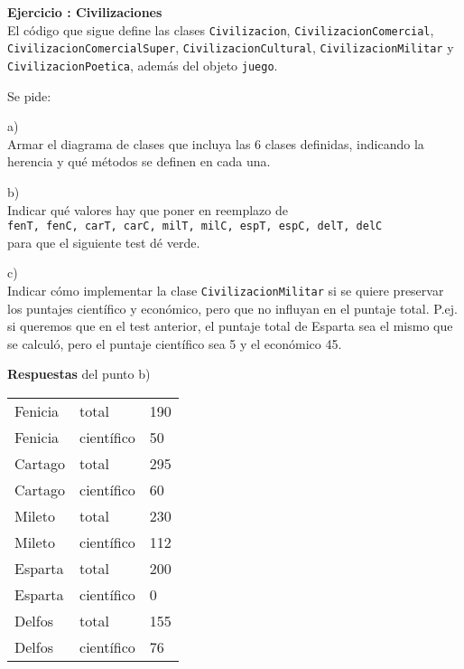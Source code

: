 \documentclass[a4paper,12pt]{article}
\newcounter{ej}
\newcounter{prte}
\newcommand{\ejercicio}[1]{\stepcounter{ej} \setcounter{prte}{0} \par \textbf{ Ejercicio \arabic{ej}: #1} \\ }
\begin{document}
\ejercicio{Civilizaciones}

El código que sigue define las clases 
\texttt{Civilizacion}, \texttt{CivilizacionComercial}, \\
\texttt{CivilizacionComercialSuper}, \texttt{CivilizacionCultural},
\texttt{CivilizacionMilitar} y \\ \texttt{CivilizacionPoetica}, además del objeto
\texttt{juego}.

\medskip\noindent


Se pide: 

a) \\
Armar el diagrama de clases que incluya las 6 clases definidas, indicando la herencia y qué métodos se definen en cada una.

\medskip\noindent
b) \\
Indicar qué valores hay que poner en reemplazo de \\
\texttt{fenT, fenC, carT, carC, milT, milC, espT, espC, delT, delC} \\
para que el siguiente test dé verde.


\noindent


c) \\
Indicar cómo implementar la clase \texttt{CivilizacionMilitar} si se quiere preservar los puntajes científico y económico, pero que no influyan en el puntaje total. 
P.ej. si queremos que en el test anterior, el puntaje total de Esparta sea el mismo que se calculó, pero el puntaje científico sea 5 y el económico 45.

\medskip

\textbf{Respuestas} del punto b) \\[4pt]
\begin{tabular}{lll}
Fenicia & total & 190 \\
Fenicia & científico & 50 \\
Cartago & total & 295 \\
Cartago & científico & 60 \\
Mileto & total & 230 \\
Mileto & científico & 112 \\
Esparta & total & 200 \\
Esparta & científico & 0 \\
Delfos & total & 155 \\
Delfos & científico & 76
\end{tabular}
\end{document}

